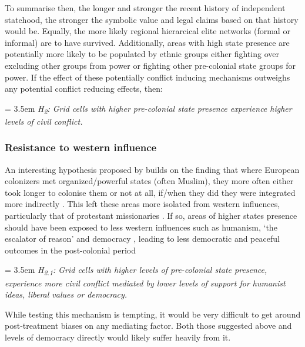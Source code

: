 \documentclass[12pt]{article}
\begin{document}
To summarise then, the longer and stronger the recent history of independent
statehood, the stronger the symbolic value and legal claims based on that
history would be. Equally, the more likely regional hierarcical elite networks
(formal or informal) are to have survived. Additionally, areas with high state
presence are potentially more likely to be populated by ethnic groups either
fighting over excluding other groups from power or fighting other pre-colonial
state groups for power. If the effect of these potentially conflict inducing
mechanisms outweighs any potential conflict reducing effects, then:

\bigskip

\hangindent = 3.5em \textit{H\textsubscript{2}: Grid cells with higher
pre-colonial state presence experience higher levels of civil conflict.}

\bigskip 

\subsubsection{Resistance to western influence}

An interesting hypothesis proposed by \citet{Wishman} builds on the finding that
where European colonizers met organized/powerful states (often Muslim), they
more often either took longer to colonise them or not at all, if/when they did
they were integrated more indirectly \citep{Gerring2011, Hariri2012,
Englebert2000}. This left these areas more isolated from western influences,
particularly that of protestant missionaries \citep{Woodberry2012}. If so, areas
of higher states presence should have been exposed to less western influences
such as humanism, `the escalator of reason' \citep{Pinker2012} and democracy
\citep{Woodberry2012, Hariri2012}, leading to less democratic and peaceful
outcomes in the post-colonial period \citep{Hegre2006}

\bigskip

\hangindent = 3.5em \textit{H\textsubscript{2.1}: Grid cells with higher levels
of pre-colonial state presence, experience more civil conflict mediated by lower
levels of support for humanist ideas, liberal values or democracy.}


\bigskip

While testing this mechanism is tempting, it would be very difficult to get
around post-treatment biases on any mediating factor. Both those suggested above
and levels of democracy directly would likely suffer heavily from it.
\end{document}
